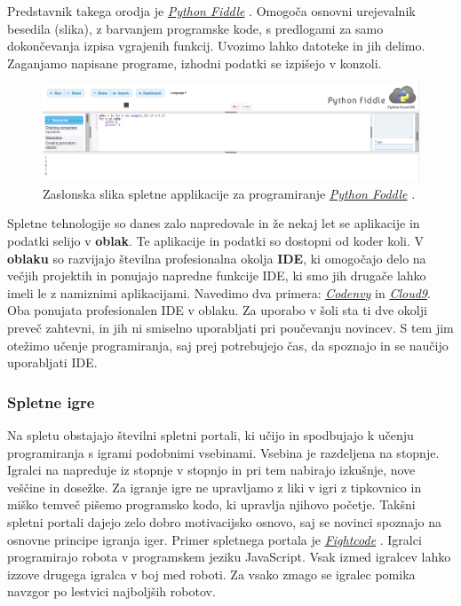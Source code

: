 Predstavnik takega orodja je
\emph{\href{http://pythonfiddle.com/}{Python Fiddle}}
\cite{web:pythonfiddle}. Omogoča osnovni urejevalnik besedila (slika), z
barvanjem programske kode, s predlogami za samo dokončevanja izpisa
vgrajenih funkcij. Uvozimo lahko datoteke in jih delimo. Zaganjamo
napisane programe, izhodni podatki se izpišejo v konzoli.

\begin{figure}[h!]
    \includegraphics [width=1\linewidth, keepaspectratio =
    1] {./images/sc_web/PythonFiddle_01.png}
    \caption{Zaslonska slika spletne applikacije za programiranje
      \emph{\href{http://pythonfiddle.com/}{Python Foddle}}
      \cite{web:pythonfiddle}.}
    \label{fig:scr:web:PyFiddle}
\end{figure}

Spletne tehnologije so danes zalo napredovale in že nekaj let se
aplikacije in podatki selijo v \textbf{oblak}. Te aplikacije in
podatki so dostopni od koder koli. V \textbf{oblaku} so razvijajo
številna profesionalna okolja \textbf{IDE}, ki omogočajo delo na
večjih projektih in ponujajo napredne funkcije IDE, ki smo jih drugače
lahko imeli le z namiznimi aplikacijami. Navedimo dva primera:
\emph{\href{https://codenvy.com/}{Codenvy}} \cite{web:codeenvy} in
\emph{\href{https://c9.io/}{Cloud9}}\cite{web:cloud9}. Oba ponujata
profesionalen IDE v oblaku. Za uporabo v šoli sta ti dve okolji preveč
zahtevni, in jih ni smiselno uporabljati pri poučevanju novincev. S
tem jim otežimo učenje programiranja, saj prej potrebujejo čas, da
spoznajo in se naučijo uporabljati IDE.

\subsubsection{Spletne igre}
\label{sec:spletne_igre}

Na spletu obstajajo številni spletni portali, ki učijo in spodbujajo k
učenju programiranja s igrami podobnimi vsebinami. Vsebina je
razdeljena na stopnje. Igralci na napreduje iz stopnje v stopnjo in
pri tem nabirajo izkušnje, nove veščine in dosežke. Za igranje igre ne
upravljamo z liki v igri z tipkovnico in miško temveč pišemo
programsko kodo, ki upravlja njihovo početje. Takšni spletni portali
dajejo zelo dobro motivacijsko osnovo, saj se novinci spoznajo na
osnovne principe igranja iger. Primer spletnega portala je
\emph{\href{http://fightcodegame.com/}{Fightcode}}
\cite{web:fightcode}. Igralci programirajo robota v programskem jeziku
JavaScript. Vsak izmed igralcev lahko izzove drugega igralca v boj med
roboti. Za vsako zmago se igralec pomika navzgor po lestvici
najboljših robotov.

